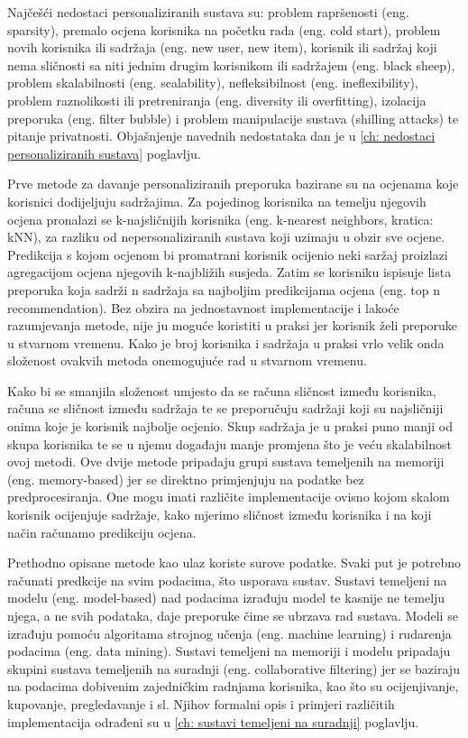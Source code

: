 \documentclass[a4paper,oneside,12pt]{memoir} %
\begin{document}
\par 
Najčešći nedostaci personaliziranih sustava su: problem rapršenosti (eng. sparsity), premalo ocjena korisnika na početku rada (eng. cold start), problem novih korisnika ili sadržaja (eng. new user, new item), korisnik ili sadržaj koji nema sličnosti sa niti jednim drugim korisnikom ili sadržajem (eng. black sheep), problem skalabilnosti (eng. scalability), nefleksibilnost (eng. ineflexibility), problem raznolikosti ili pretreniranja (eng. diversity ili overfitting), izolacija preporuka (eng. filter bubble) i problem manipulacije sustava (shilling attacks) te pitanje privatnosti. Objašnjenje navednih nedostataka dan je u \ref{ch: nedostaci personaliziranih sustava} poglavlju.
\par
Prve metode za davanje personaliziranih preporuka bazirane su na ocjenama koje korisnici dodijeljuju sadržajima. Za pojedinog korisnika na temelju njegovih ocjena pronalazi se k-najsličnijih korisnika (eng. k-nearest neighbors, kratica: kNN), za razliku od nepersonaliziranih sustava koji uzimaju u obzir sve ocjene. Predikcija s kojom ocjenom bi promatrani korisnik ocijenio neki saržaj proizlazi agregacijom ocjena njegovih k-najbližih susjeda. Zatim se korisniku ispisuje lista preporuka koja sadrži n sadržaja sa najboljim predikcijama ocjena (eng. top n recommendation). Bez obzira na jednostavnost implementacije i lakoće razumjevanja metode, nije ju moguće koristiti u praksi jer korisnik želi preporuke u stvarnom vremenu. Kako je broj korisnika i sadržaja u praksi vrlo velik onda složenost ovakvih metoda onemogujuće rad u stvarnom vremenu. 
\par
Kako bi se smanjila složenost umjesto da se računa sličnost između korisnika, računa se sličnost između sadržaja te se preporučuju sadržaji koji su najsličniji onima koje je korisnik najbolje ocjenio. Skup sadržaja je u praksi puno manji od skupa korisnika te se u njemu događaju manje promjena što je veću skalabilnost ovoj metodi. Ove dvije metode pripadaju grupi sustava temeljenih na memoriji (eng. memory-based) jer se direktno primjenjuju na podatke bez predprocesiranja. One mogu imati različite implementacije ovisno kojom skalom korisnik ocijenjuje sadržaje, kako mjerimo sličnost između korisnika i na koji način računamo predikciju ocjena.
\par
Prethodno opisane metode kao ulaz koriste surove podatke. Svaki put je potrebno računati predkcije na svim podacima, što usporava sustav. Sustavi temeljeni na modelu (eng. model-based) nad podacima izrađuju model te kasnije ne temelju njega, a ne svih podataka, daje preporuke čime se ubrzava rad sustava. Modeli se izrađuju pomoću algoritama strojnog učenja (eng. machine learning) i rudarenja podacima (eng. data mining). Sustavi temeljeni na memoriji i modelu pripadaju skupini sustava temeljenih na suradnji (eng. collaborative filtering) jer se baziraju na podacima dobivenim zajedničkim radnjama korisnika, kao što su ocijenjivanje, kupovanje, pregledavanje i sl. Njihov formalni opis i primjeri različitih implementacija odrađeni su u \ref{ch: sustavi temeljeni na suradnji} poglavlju.
\end{document}
